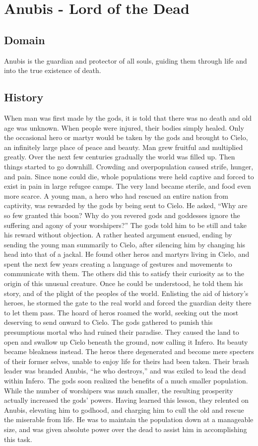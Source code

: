 \chapter{Anubis - Lord of the Dead}
\label{ch:divine-anubis}
\section{Domain}
Anubis is the guardian and protector of all souls, guiding them through life and into the true existence of death.
\section{History}
When man was first made by the gods, it is told that there was no death and old age was unknown. When people were injured, their bodies simply healed. Only the occasional hero or martyr would be taken by the gods and brought to Cielo, an infinitely large place of peace and beauty.
Man grew fruitful and multiplied greatly. Over the next few centuries gradually the world was filled up. Then things started to go downhill. Crowding and overpopulation caused strife, hunger, and pain. Since none could die, whole populations were held captive and forced to exist in pain in large refugee camps. The very land became sterile, and food even more scarce.
A young man, a hero who had rescued an entire nation from captivity, was rewarded by the gods by being sent to Cielo. He asked, “Why are so few granted this boon? Why do you revered gods and goddesses ignore the suffering and agony of your worshipers?” The gods told him to be still and take his reward without objection. A rather heated argument ensued, ending by sending the young man summarily to Cielo, after silencing him by changing his head into that of a jackal.
He found other heros and martyrs living in Cielo, and spent the next few years creating a language of gestures and movements to communicate with them. The others did this to satisfy their curiosity as to the origin of this unusual creature. Once he could be understood, he told them his story, and of the plight of the peoples of the world.
Enlisting the aid of history’s heroes, he stormed the gate to the real world and forced the guardian deity there to let them pass. The hoard of heros roamed the world, seeking out the most deserving to send onward to Cielo.
The gods gathered to punish this presumptious mortal who had ruined their paradise. They caused the land to open and swallow up Cielo beneath the ground, now calling it Infero. Its beauty became bleakness instead. The heros there degenerated and become mere specters of their former selves, unable to enjoy life for theirs had been taken. Their brash leader was branded Anubis, “he who destroys,” and was exiled to lead the dead within Infero.
The gods soon realized the benefits of a much smaller population. While the number of worshipers was much smaller, the resulting prosperity actually increased the gods’ powers. Having learned this lesson, they relented on Anubis, elevating him to godhood, and charging him to cull
the old and rescue the miserable from life. He was to maintain the population down at a manageable size, and was given absolute power over the dead to assist him in accomplishing this task.
